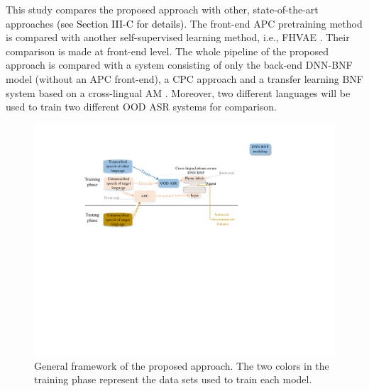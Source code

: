 \documentclass[transmag]{IEEEtran}
\begin{document}
This study compares the proposed approach with other, state-of-the-art approaches \textcolor{black}{(see Section III-C for details)}. The front-end APC pretraining method is compared with another self-supervised learning method, i.e., FHVAE \cite{hsu2017nips}. Their comparison is made at  front-end level.
The whole pipeline of the proposed approach is compared with a system consisting of only the back-end DNN-BNF model (without an APC front-end), a CPC approach \cite{oord2018cpc}  and a transfer learning BNF system based on a cross-lingual AM  \cite{shibata2017composite}. Moreover, two different languages will be used to train two different OOD ASR systems for comparison.

\begin{figure}[!t]
    \centering
    \includegraphics[width=\linewidth]{apc_framework_detail_other_lang_revised_AQ.pdf}
    \caption{General framework of the proposed approach. The two colors in the training phase represent the data sets used to train each model.}
    \label{fig:general_framework}
\end{figure}
\end{document}

